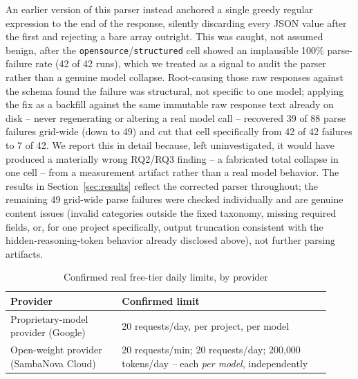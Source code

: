 \documentclass[conference]{IEEEtran}
\begin{document}
An earlier version of this parser instead anchored a single greedy regular
expression to the end of the response, silently discarding every JSON value
after the first and rejecting a bare array outright. This was caught, not
assumed benign, after the \texttt{opensource}/\texttt{structured} cell
showed an implausible 100\% parse-failure rate (42 of 42 runs), which we
treated as a signal to audit the parser rather than a genuine model
collapse. Root-causing those raw responses against the schema found the
failure was structural, not specific to one model; applying the fix as a
backfill against the same immutable raw response text already on disk --
never regenerating or altering a real model call -- recovered 39 of 88
parse failures grid-wide (down to 49) and cut that cell specifically from
42 of 42 failures to 7 of 42. We report this in detail because, left
uninvestigated, it would have produced a materially wrong RQ2/RQ3 finding
-- a fabricated total collapse in one cell -- from a measurement artifact
rather than a real model behavior. The results in
Section~\ref{sec:results} reflect the corrected parser throughout; the
remaining 49 grid-wide parse failures were checked individually and are
genuine content issues (invalid categories outside the fixed taxonomy,
missing required fields, or, for one project specifically, output
truncation consistent with the hidden-reasoning-token behavior already
disclosed above), not further parsing artifacts.

\begin{table}[t]
\centering
\small
\caption{Confirmed real free-tier daily limits, by provider}
\label{tab:quotas}
\begin{tabular}{@{}p{0.32\linewidth}p{0.6\linewidth}@{}}
\toprule
\textbf{Provider} & \textbf{Confirmed limit} \\
\midrule
Proprietary-model provider (Google) & 20 requests/day, per project, per model \\
Open-weight provider (SambaNova Cloud) & 20 requests/min; 20 requests/day; 200{,}000 tokens/day -- each \emph{per model}, independently \\
\bottomrule
\end{tabular}
\end{table}
\end{document}
